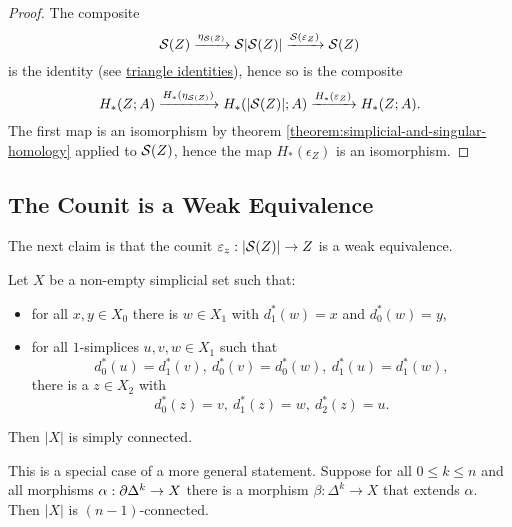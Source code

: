 \begin{proof}
The composite
\[\S(Z)\xto{\eta_{\S(Z)}}\S|\S(Z)|\xto{\S(\epsilon_Z)}\S(Z)\]
is the identity (see \href{http://nlab-pages.s3.us-east-2.amazonaws.com/nlab/show/triangle+identities}{triangle identities}), hence so is the composite
\[H_*(Z;A)\xto{H_*(\eta_{\S(Z)})}H_*(|\S(Z)|;A)\xto{H_*(\epsilon_Z)}H_*(Z;A).\]
The first map is an isomorphism by theorem \ref{theorem:simplicial-and-singular-homology} applied to $\S(Z)$, hence the map $H_*(\epsilon_Z)$ is an isomorphism.
\end{proof}

\subsection{The Counit is a Weak Equivalence}

The next claim is that the counit $\epsilon_z:|\S(Z)|\to Z$ is a weak equivalence.

\begin{proposition}\label{proposition:simply-connected-realization}
Let $X$ be a non-empty simplicial set such that\alvaropls:
\begin{itemize}[label={-}]
    \item for all $x,y\in X_0$ there is $w\in X_1$ with $d_1^*(w)=x$ and $d_0^*(w)=y$,
    \item for all $1$-simplices $u,v,w\in X_1$ such that
    \[d_0^*(u)=d_1^*(v),\ d_0^*(v)=d_0^*(w),\ d_1^*(u)=d_1^*(w),\]
    there is a $z\in X_2$ with
    \[d_0^*(z)=v,\ d_1^*(z)=w,\ d_2^*(z)=u.\]
\end{itemize}
Then $|X|$ is simply connected.
\end{proposition}

\begin{remark}
This is a special case of a more general statement. Suppose for all $0\le k\le n$ and all morphisms $\alpha:\de\Delta^k\to X$ there is a morphism $\beta:\Delta^k\to X$ that extends $\alpha$. Then $|X|$ is $(n-1)$-connected.
\end{remark}

